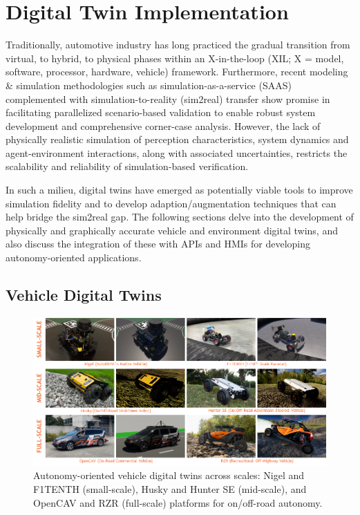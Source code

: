 \hypertarget{Digital Twin Implementation}{%
\section{Digital Twin Implementation}\label{Digital Twin Implementation}}

Traditionally, automotive industry has long practiced the gradual transition from virtual, to hybrid, to physical phases within an X-in-the-loop (XIL; X = model, software, processor, hardware, vehicle) framework. Furthermore, recent modeling \& simulation methodologies such as simulation-as-a-service (SAAS) complemented with simulation-to-reality (sim2real) transfer show promise in facilitating parallelized scenario-based validation to enable robust system development and comprehensive corner-case analysis. However, the lack of physically realistic simulation of perception characteristics, system dynamics and agent-environment interactions, along with associated uncertainties, restricts the scalability and reliability of simulation-based verification. 

In such a milieu, digital twins have emerged as potentially viable tools to improve simulation fidelity and to develop adaption/augmentation techniques that can help bridge the sim2real gap. The following sections delve into the development of physically and graphically accurate vehicle and environment digital twins, and also discuss the integration of these with APIs and HMIs for developing autonomy-oriented applications.

\hypertarget{Vehicle Digital Twins}{%
\subsection{Vehicle Digital Twins}\label{Vehicle Digital Twins}}

\begin{figure}[t]
    \centering
    \includegraphics[width=\linewidth]{Figures/fig4.png}
    \caption{Autonomy-oriented vehicle digital twins across scales: Nigel and F1TENTH (small-scale), Husky and Hunter SE (mid-scale), and OpenCAV and RZR (full-scale) platforms for on/off-road autonomy.}
    \label{fig: figure4}
\end{figure}

